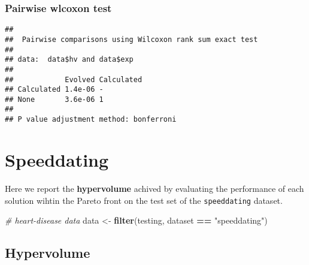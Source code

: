 \documentclass[
]{book}
\newenvironment{Shaded}{\begin{snugshade}}{\end{snugshade}}
\newcommand{\AttributeTok}[1]{\textcolor[rgb]{0.13,0.29,0.53}{#1}}
\newcommand{\CommentTok}[1]{\textcolor[rgb]{0.56,0.35,0.01}{\textit{#1}}}
\newcommand{\ConstantTok}[1]{\textcolor[rgb]{0.56,0.35,0.01}{#1}}
\newcommand{\FunctionTok}[1]{\textcolor[rgb]{0.13,0.29,0.53}{\textbf{#1}}}
\newcommand{\NormalTok}[1]{#1}
\newcommand{\OtherTok}[1]{\textcolor[rgb]{0.56,0.35,0.01}{#1}}
\newcommand{\SpecialCharTok}[1]{\textcolor[rgb]{0.81,0.36,0.00}{\textbf{#1}}}
\newcommand{\StringTok}[1]{\textcolor[rgb]{0.31,0.60,0.02}{#1}}
\begin{document}
\hypertarget{pairwise-wlcoxon-test-8}{%
\subsection{Pairwise wlcoxon test}\label{pairwise-wlcoxon-test-8}}

\begin{Shaded}
\end{Shaded}

\begin{verbatim}
## 
##  Pairwise comparisons using Wilcoxon rank sum exact test 
## 
## data:  data$hv and data$exp 
## 
##            Evolved Calculated
## Calculated 1.4e-06 -         
## None       3.6e-06 1         
## 
## P value adjustment method: bonferroni
\end{verbatim}

\hypertarget{speeddating}{%
\chapter{Speeddating}\label{speeddating}}

Here we report the \textbf{hypervolume} achived by evaluating the performance of each solution wihtin the Pareto front on the test set of the \texttt{speeddating} dataset.

\begin{Shaded}
\begin{Highlighting}[]
\CommentTok{\# heart{-}disease data}
\NormalTok{data }\OtherTok{\textless{}{-}} \FunctionTok{filter}\NormalTok{(testing, dataset }\SpecialCharTok{==} \StringTok{"speeddating"}\NormalTok{)}
\end{Highlighting}
\end{Shaded}

\hypertarget{hypervolume-9}{%
\section{Hypervolume}\label{hypervolume-9}}
\end{document}
